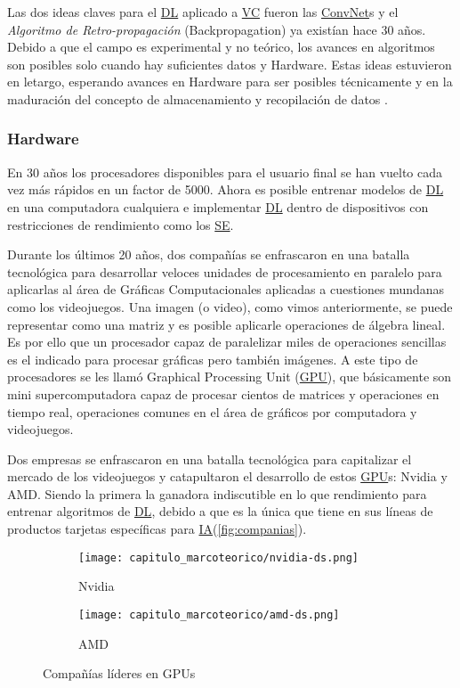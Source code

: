 Las dos ideas claves para el \hyperlink{abbr}{DL} aplicado a
\hyperlink{abbr}{VC} fueron las \hyperlink{abbr}{ConvNet}s y el \emph{Algoritmo
de Retro-propagación} (Backpropagation) ya existían hace 30 años. Debido a que
el campo es experimental y no teórico, los avances en algoritmos son posibles
solo cuando hay suficientes datos y Hardware. Estas ideas estuvieron en letargo,
esperando avances en Hardware para ser posibles técnicamente y en la maduración
del concepto de almacenamiento y recopilación de datos \cite{Chollet2018}.

\subsubsection{Hardware}

En 30 años los procesadores disponibles para el usuario final se han vuelto cada
vez más rápidos en un factor de 5000. Ahora es posible entrenar modelos de
\hyperlink{abbr}{DL} en una computadora cualquiera e implementar
\hyperlink{abbr}{DL} dentro de dispositivos con restricciones de rendimiento
como los \hyperlink{abbr}{SE}.

Durante los últimos 20 años, dos compañías se enfrascaron en una batalla
tecnológica para desarrollar veloces unidades de procesamiento en paralelo para
aplicarlas al área de Gráficas Computacionales aplicadas a cuestiones mundanas
como los videojuegos. Una imagen (o video), como vimos anteriormente, se puede
representar como una matriz y es posible aplicarle operaciones de álgebra
lineal. Es por ello que un procesador capaz de paralelizar miles de operaciones
sencillas es el indicado para procesar gráficas pero también imágenes. A este
tipo de procesadores se les llamó Graphical Processing Unit
(\hyperlink{abbr}{GPU}), que
básicamente son mini supercomputadora capaz de procesar cientos de matrices y
operaciones en tiempo real, operaciones comunes en el área de gráficos por
computadora y videojuegos. 

Dos empresas se enfrascaron en una batalla tecnológica para capitalizar el
mercado de los videojuegos y catapultaron el desarrollo de estos
\hyperlink{abbr}{GPU}s: Nvidia y AMD. Siendo la primera la ganadora indiscutible
en lo que rendimiento para entrenar algoritmos de \hyperlink{abbr}{DL}, debido a
que es la única que tiene en sus líneas de productos tarjetas específicas para
\hyperlink{abbr}{IA}(\autoref{fig:companias}).


\begin{figure}[H]
    \centering
    \begin{subfigure}{.5\textwidth}
      \centering
      \texttt{[image: capitulo\_marcoteorico/nvidia-ds.png]}
      \caption{Nvidia}
      \label{fig:Nvidia}
    \end{subfigure}%
    \begin{subfigure}{.5\textwidth}
      \centering
      \texttt{[image: capitulo\_marcoteorico/amd-ds.png]}
      \caption{AMD}
      \label{fig:AMD}
    \end{subfigure}
    \caption{Compañías líderes en GPUs}
    \label{fig:companias}
    \end{figure}

